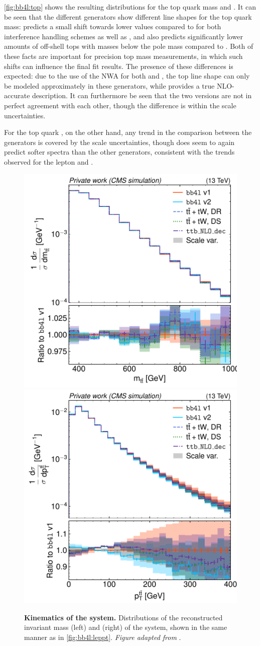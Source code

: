 \cref{fig:bb4l:top} shows the resulting distributions for the top quark mass and \pt. It can be seen that the different generators show different line shapes for the top quark mass: \bbfourl predicts a small shift towards lower values compared to \tttWsum for both interference handling schemes as well as \ttb, and also predicts significantly lower amounts of off-shell tops with masses below the pole mass compared to \tttWsum. Both of these facts are important for precision top mass measurements, in which such shifts can influence the final fit results. The presence of these differences is expected: due to the use of the NWA for both \tttWsum and \ttb, the top line shape can only be modeled approximately in these generators, while \bbfourl provides a true NLO-accurate description. It can furthermore be seen that the two \bbfourl versions are not in perfect agreement with each other, though the difference is within the scale uncertainties.

For the top quark \pt, on the other hand, any trend in the comparison between the generators is covered by the scale uncertainties, though \bbfourl does seem to again predict softer \pt spectra than the other generators, consistent with the trends observed for the lepton \pt and \mll.

\begin{figure}[tp]
    \centering
    \includegraphics[width=0.49 \textwidth]{figures/bb4l/generators/MC_TTBAR_DILEP_SPINDENSITY_ttbar_mass.pdf}
    \hfill
    \includegraphics[width=0.49 \textwidth]{figures/bb4l/generators/MC_TTBAR_DILEP_SPINDENSITY_ttbar_pt.pdf}
    \caption{\textbf{Kinematics of the \ttbar system.} Distributions of the reconstructed invariant mass (left) and \pt (right) of the \ttbar system, shown in the same manner as in \cref{fig:bb4l:leppt}. \textit{Figure adapted from }.}
    \label{fig:bb4l:ttbar}
\end{figure}

